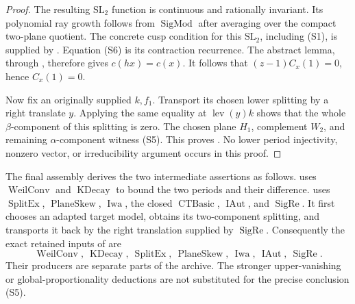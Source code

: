 \begin{proof}
The resulting \(\mathrm{SL}_2\) function is continuous and
rationally invariant. Its polynomial ray growth follows
from \(\operatorname{SigMod}\) after averaging over the compact
two-plane quotient. The concrete cusp condition for this
\(\mathrm{SL}_2\), including (S1), is supplied by
.
Equation (S6) is its contraction recurrence.
The abstract lemma, through ,
therefore gives \(c(hx)=c(x)\).
It follows that \((z-1)C_x(1)=0\), hence \(C_x(1)=0\).

Now fix an originally supplied \(k,f_1\).
Transport its chosen lower splitting by a right translate \(y\).
Applying the same equality at \(\operatorname{lev}(y)k\)
shows that the whole \(\beta\)-component of this splitting
is zero. The chosen plane \(H_1\), complement \(W_2\), and
remaining \(\alpha\)-component witness (S5).
This proves .
No lower period injectivity, nonzero vector, or
irreducibility argument occurs in this proof.
\end{proof}

The final assembly  derives the
two intermediate assertions as follows.
 uses \(\operatorname{WeilConv}\)
and \(\operatorname{KDecay}\) to bound the two periods and
their difference.
 uses
\(\operatorname{SplitEx}\), \(\operatorname{PlaneSkew}\),
\(\operatorname{Iwa}\), the closed \(\operatorname{CTBasic}\),
\(\operatorname{IAut}\), and \(\operatorname{SigRe}\).
It first chooses an adapted target model, obtains its
two-component splitting, and transports it back by the
right translation supplied by \(\operatorname{SigRe}\).
Consequently the exact retained inputs of 
are
\[
 \operatorname{WeilConv},\ \operatorname{KDecay},\
 \operatorname{SplitEx},\ \operatorname{PlaneSkew},\
 \operatorname{Iwa},\ \operatorname{IAut},\
 \operatorname{SigRe}.
\]
Their producers are separate parts of the archive.
The stronger upper-vanishing or global-proportionality deductions
are not substituted for the precise conclusion (S5).
